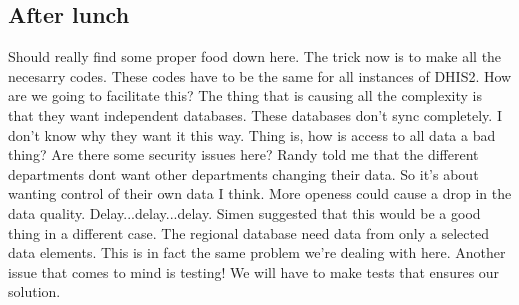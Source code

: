 \subsection{After lunch}
Should really find some proper food down here. The trick now is to make all the necesarry codes. These codes have to be the same for all instances of DHIS2. How are we going to facilitate this? The thing that is causing all the complexity is that they want independent databases. These databases don't sync completely. I don't know why they want it this way.
Thing is, how is access to all data a bad thing? Are there some security issues here? Randy told me that the different departments dont want other departments changing their data. So it's about wanting control of their own data I think. More openess could cause a drop in the data quality.
Delay...delay...delay.
Simen suggested that this would be a good thing in a different case. The regional database need data from only a selected data elements. This is in fact the same problem we're dealing with here.
Another issue that comes to mind is testing! We will have to make tests that ensures our solution.
